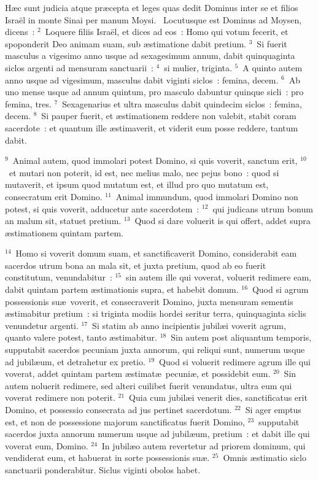  H\ae c sunt judicia atque pr\ae cepta et leges quas dedit Dominus inter se et filios Isra\"el in monte Sinai per manum Moysi.
~\lettrine[lines=10,image=true,loversize=0.05,lraise=-0.03]{L}{}ocutusque est Dominus ad Moysen, dicens~:
${}^{2}$~Loquere filiis Isra\"el, et dices ad eos~: Homo qui votum fecerit, et spoponderit Deo animam suam, sub \ae stimatione dabit pretium.
${}^{3}$~Si fuerit masculus a vigesimo anno usque ad sexagesimum annum, dabit quinquaginta siclos argenti ad mensuram sanctuarii~:
${}^{4}$~si mulier, triginta.
${}^{5}$~A quinto autem anno usque ad vigesimum, masculus dabit viginti siclos~: femina, decem.
${}^{6}$~Ab uno mense usque ad annum quintum, pro masculo dabuntur quinque sicli~: pro femina, tres.
${}^{7}$~Sexagenarius et ultra masculus dabit quindecim siclos~: femina, decem.
${}^{8}$~Si pauper fuerit, et \ae stimationem reddere non valebit, stabit coram sacerdote~: et quantum ille \ae stimaverit, et viderit eum posse reddere, tantum dabit.


${}^{9}$~Animal autem, quod immolari potest Domino, si quis voverit, sanctum erit,
${}^{10}$~et mutari non poterit, id est, nec melius malo, nec pejus bono~: quod si mutaverit, et ipsum quod mutatum est, et illud pro quo mutatum est, consecratum erit Domino.
${}^{11}$~Animal immundum, quod immolari Domino non potest, si quis voverit, adducetur ante sacerdotem~:
${}^{12}$~qui judicans utrum bonum an malum sit, statuet pretium.
${}^{13}$~Quod si dare voluerit is qui offert, addet supra \ae stimationem quintam partem.


${}^{14}$~Homo si voverit domum suam, et sanctificaverit Domino, considerabit eam sacerdos utrum bona an mala sit, et juxta pretium, quod ab eo fuerit constitutum, venundabitur~:
${}^{15}$~sin autem ille qui voverat, voluerit redimere eam, dabit quintam partem \ae stimationis supra, et habebit domum.
${}^{16}$~Quod si agrum possessionis su\ae\ voverit, et consecraverit Domino, juxta mensuram sementis \ae stimabitur pretium~: si triginta modiis hordei seritur terra, quinquaginta siclis venundetur argenti.
${}^{17}$~Si statim ab anno incipientis jubil\ae i voverit agrum, quanto valere potest, tanto \ae stimabitur.
${}^{18}$~Sin autem post aliquantum temporis, supputabit sacerdos pecuniam juxta annorum, qui reliqui sunt, numerum usque ad jubil\ae um, et detrahetur ex pretio.
${}^{19}$~Quod si voluerit redimere agrum ille qui voverat, addet quintam partem \ae stimat\ae\ pecuni\ae , et possidebit eum.
${}^{20}$~Sin autem noluerit redimere, sed alteri cuilibet fuerit venundatus, ultra eum qui voverat redimere non poterit.
${}^{21}$~Quia cum jubil\ae i venerit dies, sanctificatus erit Domino, et possessio consecrata ad jus pertinet sacerdotum.
${}^{22}$~Si ager emptus est, et non de possessione majorum sanctificatus fuerit Domino,
${}^{23}$~supputabit sacerdos juxta annorum numerum usque ad jubil\ae um, pretium~: et dabit ille qui voverat eum, Domino.
${}^{24}$~In jubil\ae o autem revertetur ad priorem dominum, qui vendiderat eum, et habuerat in sorte possessionis su\ae .
${}^{25}$~Omnis \ae stimatio siclo sanctuarii ponderabitur. Siclus viginti obolos habet.


